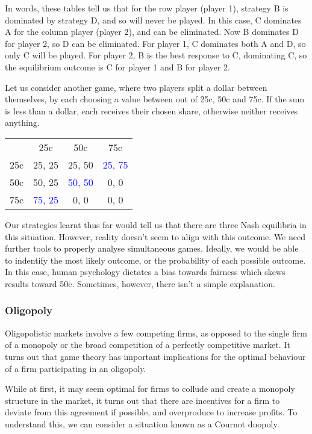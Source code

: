 \documentclass[12pt]{report}
\begin{document}
\begin{flushleft}
In words, these tables tell us that for the row player (player 1), strategy
B is dominated by strategy D, and so will never be played. In this case, C
dominates A for the column player (player 2), and can be eliminated. Now B
dominates D for player 2, so D can be eliminated. For player 1, C dominates
both A and D, so only C will be played. For player 2, B is the best response
to C, dominating C, so the equilibrium outcome is C for player 1 and B for 
player 2. 

\bigskip
Let us consider another game, where two players split a dollar between 
themselves, by each choosing a value between out of 25c, 50c and 75c. If
the sum is less than a dollar, each receives their chosen share, otherwise
neither receives anything.

\begin{center}
    \begin{tabular}{c|c|c|c|}
        & 25c & 50c & 75c \\
        25c & 25, 25 & 25, 50 & \textcolor{blue}{25, 75} \\
        50c & 50, 25 & \textcolor{blue}{50, 50} & 0, 0 \\
        75c & \textcolor{blue}{75, 25} & 0, 0 & 0, 0 \\
    \end{tabular}
\end{center}

Our strategies learnt thus far would tell us that there are three Nash 
equilibria in this situation. However, reality doesn't seem to align with
this outcome. We need further tools to properly analyse simultaneous games.
Ideally, we would be able to indentify the most likely outcome, or the 
probability of each possible outcome. In this case, human psychology dictates
a bias towards fairness which skews results toward 50c. Sometimes, however,
there isn't a simple explanation.

\subsubsection*{Oligopoly}
Oligopolistic markets involve a few competing firms, as opposed to the single
firm of a monopoly or the broad competition of a perfectly competitive market.
It turns out that game theory has important implications for the optimal 
behaviour of a firm participating in an oligopoly.

\bigskip
While at first, it may seem optimal for firms to collude and create a monopoly
structure in the market, it turns out that there are incentives for a firm to
deviate from this agreement if possible, and overproduce to increase profits.
To understand this, we can consider a situation known as a Cournot duopoly.


\end{flushleft}
\end{document}
